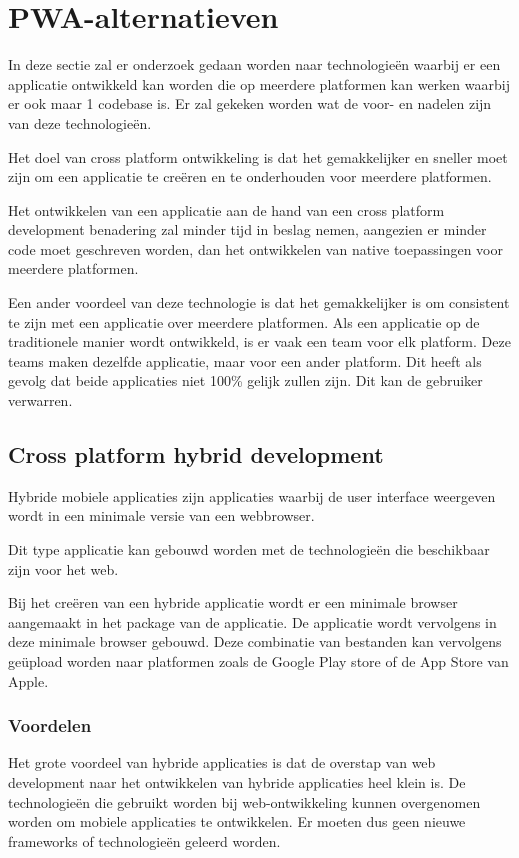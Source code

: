 \clearpage
\section{PWA-alternatieven}
\label{ch:pwaAlternatieven}

In deze sectie zal er onderzoek gedaan worden naar technologieën waarbij er een applicatie ontwikkeld kan worden die op meerdere platformen kan werken waarbij er ook maar 1 codebase is. Er zal gekeken worden wat de voor- en nadelen zijn van deze technologieën. 

Het doel van cross platform ontwikkeling is dat het gemakkelijker en sneller moet zijn om een applicatie te creëren en te onderhouden voor meerdere platformen.

Het ontwikkelen van een applicatie aan de hand van een cross platform development benadering zal minder tijd in beslag nemen, aangezien er minder code moet geschreven worden, dan het ontwikkelen van native toepassingen voor meerdere platformen. 

Een ander voordeel van deze technologie is dat het gemakkelijker is om consistent te zijn met een applicatie over meerdere platformen. Als een applicatie op de traditionele manier wordt ontwikkeld, is er vaak een team voor elk platform. Deze teams maken dezelfde applicatie, maar voor een ander platform. Dit heeft als gevolg dat beide applicaties niet 100\% gelijk zullen zijn. Dit kan de gebruiker verwarren.


\subsection{Cross platform hybrid development}

	Hybride mobiele applicaties zijn applicaties waarbij de user interface weergeven wordt in een minimale versie van een webbrowser.
		
	Dit type applicatie kan gebouwd worden met de technologieën die beschikbaar zijn voor het web.
	
	Bij het creëren van een hybride applicatie wordt er een minimale browser aangemaakt in het package van de applicatie. De applicatie wordt vervolgens in deze minimale browser gebouwd. Deze combinatie van bestanden kan vervolgens geüpload worden naar platformen zoals de Google Play store of de App Store van Apple.
	\autocite{Huynh2017}
	
	
	\subsubsection{Voordelen}
		Het grote voordeel van hybride applicaties is dat de overstap van web development naar het ontwikkelen van hybride applicaties heel klein is. De technologieën die gebruikt worden bij web-ontwikkeling kunnen overgenomen worden om mobiele applicaties te ontwikkelen. Er moeten dus geen nieuwe frameworks of technologieën geleerd worden.
		
